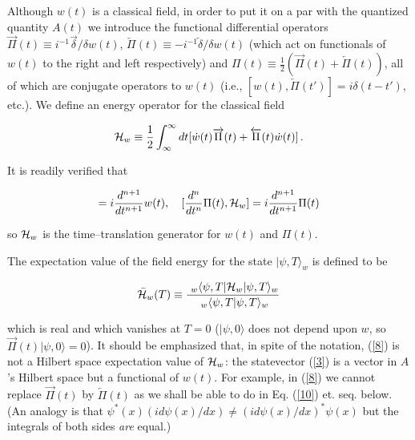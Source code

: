 \documentclass[12pt]{article}
\begin{document}
\hspace{\parindent}Although $w(t)$ is a classical field, in order to put it on a par with 
 the quantized quantity $A(t)$ we introduce the functional differential 
 operators $\overrightarrow\Pi (t)\equiv i^{-1}\overrightarrow\delta /\delta w(t)$, 
 $\overleftarrow\Pi (t)\equiv -i^{-1}\overleftarrow\delta /\delta w(t)$ (which 
 act on functionals of $w(t)$ to the right 
 and left respectively) and
 $\Pi (t)\equiv\frac{1}{2} (\overrightarrow\Pi (t) + \overleftarrow\Pi (t))$, all of 
 which are conjugate operators to $w(t)$ (i.e., 
 $[w(t),\overleftarrow\Pi (t')]=i\delta (t-t')$, etc.). We define an energy 
 operator for the classical field 
 
  \begin{equation}\label{7}
{\cal H}_{w}\equiv \frac{1}{2}\int_{\infty}^{\infty}dt
[\dot{w}(t)\overrightarrow\Pi (t) + \overleftarrow\Pi (t)\dot{w}(t)]\, .
\end{equation}

	It is readily verified that 
	
\begin{displaymath}
[\frac{d^{n}}{dt^{n}}w(t),{\cal H}_{w}]=i\frac{d^{n+1}}{dt^{n+1}}w(t),\quad 
[\frac{d^{n}}{dt^{n}}\Pi (t),{\cal H}_{w}]=i\frac{d^{n+1}}{dt^{n+1}}\Pi (t) 	
\end{displaymath}

\noindent so ${\cal H}_{w}$ is the time--translation generator for $w(t)$ and $\Pi (t)$.  

	The expectation value of the field energy for the state $|\psi,T\rangle _{w}$ is defined to be 
	
\begin{equation}\label{8}
\bar{\cal H}_{w}(T)\equiv \frac{\ _{w}\langle \psi,T|{\cal H}_{w}|\psi,T\rangle _{w}}
{\ _{w}\langle \psi,T|\psi,T\rangle _{w}}
\end{equation}

\noindent which is real and which 
vanishes at $T=0$ ($|\psi,0\rangle$ does not depend upon $w$,  
so $\overrightarrow\Pi (t)|\psi,0\rangle =0$). It 
should be emphasized that, in spite of the notation, (\ref{8}) is
not a Hilbert space expectation value of ${\cal H}_{w}$: the statevector (\ref{3}) is a vector in $A$'s 
Hilbert space but a functional of $w(t)$.  For example, in (\ref{8}) we cannot 
replace $\overrightarrow\Pi (t)$ by $\overleftarrow\Pi (t)$ as we shall be able to 
do in Eq. (\ref{10}) et. seq. below.  (An analogy is that $\psi^{*}(x)(id\psi(x)/dx)\neq (id\psi(x)/dx)^{*}\psi(x)$ 
but the integrals of both sides {\it are} equal.)
\end{document}
